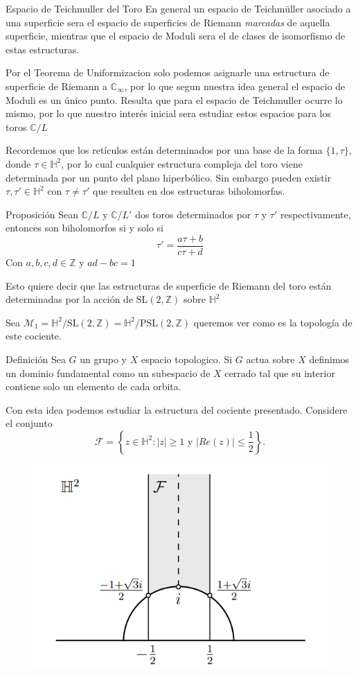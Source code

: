 \documentclass[xcolor=dvipsnames,10pt]{beamer}
\newcommand\Z{\ensuremath{\mathbb{Z}}}
\newcommand\C{\ensuremath{\mathbb{C}}}
\newcommand\Hs{\ensuremath{\mathbb{H}}}
\begin{document}
\begin{frame}{Espacio de Teichmuller del Toro}
    En general un espacio de Teichmüller asociado a una superficie sera el espacio de superficies de Riemann \textit{marcadas} de aquella superficie, mientras que el espacio de Moduli sera el de clases de isomorfismo de estas estructuras.\\
    \vspace{0.5cm}

    Por el Teorema de Uniformizacion solo podemos asignarle una estructura de superficie de Riemann a $\C_\infty$, por lo que segun nuestra idea general el espacio de Moduli es un único punto. Resulta que para el espacio de Teichmuller ocurre lo mismo, por lo que nuestro interés inicial sera estudiar estos espacios para los toros $\C/L$
\end{frame}
\begin{frame}
    Recordemos que los retículos están determinados por una base de la forma $\{1,\tau\}$, donde $\tau\in \Hs^2$, por lo cual cualquier estructura compleja del toro viene determinada por un punto del plano hiperbólico. Sin embargo pueden existir $\tau, \tau' \in \Hs^2$ con $\tau \neq \tau'$ que resulten en dos estructuras biholomorfas.

    \begin{block}{Proposición}
        Sean $\C/L$ y $\C/L'$ dos toros determinados por $\tau$ y $\tau'$ respectivamente, entonces son biholomorfos si y solo si
        \[
            \tau' = \frac{a\tau + b}{c\tau + d}
        \]
        Con $a,b,c,d \in \Z$ y $ad-bc=1$
    \end{block}

    Esto quiere decir que las estructuras de superficie de Riemann del toro están determinadas por la acción de $\text{SL}(2,\Z)$ sobre $\Hs^2$
\end{frame}
\begin{frame}
    Sea $\mathcal{M}_1 = \Hs^2/\text{SL}(2,\Z) = \Hs^2/\text{PSL}(2,\Z)$ queremos ver como es la topología de este cociente. 
    \begin{block}{Definición}
        Sea $G$ un grupo y $X$ espacio topologico. Si $G$ actua sobre $X$ definimos un dominio fundamental como un subespacio de $X$ cerrado tal que su interior contiene solo un elemento de cada orbita.
    \end{block}
    Con esta idea podemos estudiar la estructura del cociente presentado. Considere el conjunto 
    $$\mathcal{F}=\left\{z\in\Hs^2:|z|\geq 1\text{ y } |Re(z)|\leq \frac{1}{2}\right\}.$$
    \begin{figure}
            \centering
            \includegraphics[width=0.4\linewidth]{Imagenes/FunDom.png}
        \end{figure} 
    
\end{frame}
\end{document}
